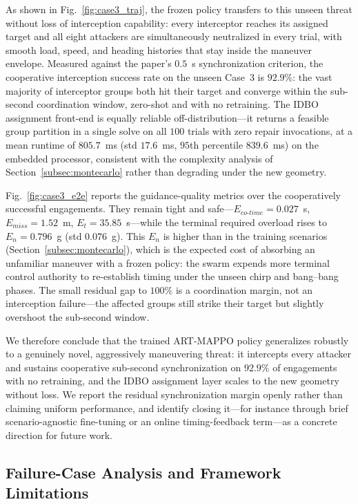 \documentclass[lettersize,journal]{IEEEtran}
\newcommand{\hladd}[1]{{\color{blue}#1}}
\begin{document}
\hladd{As shown in Fig.~\ref{fig:case3_traj}, the frozen policy transfers to this unseen threat
without loss of interception capability: every interceptor reaches its assigned target and all eight
attackers are simultaneously neutralized in every trial, with smooth load, speed, and heading
histories that stay inside the maneuver envelope. Measured against the paper's $0.5$~s synchronization
criterion, the cooperative interception success rate on the unseen Case~3 is $92.9\%$: the vast
majority of interceptor groups both hit their target and converge within the sub-second coordination
window, zero-shot and with no retraining. The IDBO assignment front-end is equally reliable
off-distribution---it returns a feasible group partition in a single solve on all $100$ trials with
zero repair invocations, at a mean runtime of $805.7$~ms (std $17.6$~ms, $95$th percentile
$839.6$~ms) on the embedded processor, consistent with the complexity analysis of
Section~\ref{subsec:montecarlo} rather than degrading under the new geometry.}

\hladd{Fig.~\ref{fig:case3_e2e} reports the guidance-quality metrics over the cooperatively successful
engagements. They remain tight and safe---$E_{co\text{-}time}=0.027$~s, $E_{miss}=1.52$~m,
$E_t=35.85$~s---while the terminal required overload rises to $E_n=0.796$~g (std $0.076$~g). This
$E_n$ is higher than in the training scenarios (Section~\ref{subsec:montecarlo}), which is the
expected cost of absorbing an unfamiliar maneuver with a frozen policy: the swarm expends more
terminal control authority to re-establish timing under the unseen chirp and bang--bang phases. The
small residual gap to $100\%$ is a coordination margin, not an interception failure---the affected
groups still strike their target but slightly overshoot the sub-second window.}

\hladd{We therefore conclude that the trained ART-MAPPO policy generalizes robustly to a genuinely
novel, aggressively maneuvering threat: it intercepts every attacker and sustains cooperative
sub-second synchronization on $92.9\%$ of engagements with no retraining, and the IDBO assignment
layer scales to the new geometry without loss. We report the residual synchronization margin openly
rather than claiming uniform performance, and identify closing it---for instance through brief
scenario-agnostic fine-tuning or an online timing-feedback term---as a concrete direction for future
work.}

\subsection{\hladd{Failure-Case Analysis and Framework Limitations}}
\label{subsec:failure}
\end{document}
